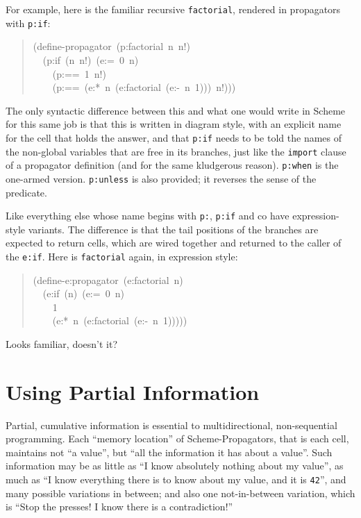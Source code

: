 \documentclass[12pt,letterpaper,english]{article}
\begin{document}
For example, here is the familiar recursive \texttt{factorial}, rendered in
propagators with \texttt{p:if}:
\begin{quote}{\ttfamily \raggedright \noindent
(define-propagator~(p:factorial~n~n!)~\\
~~(p:if~(n~n!)~(e:=~0~n)~\\
~~~~(p:==~1~n!)~\\
~~~~(p:==~(e:*~n~(e:factorial~(e:-~n~1)))~n!)))
}\end{quote}

The only syntactic difference between this and what one would write in
Scheme for this same job is that this is written in diagram style,
with an explicit name for the cell that holds the answer, and that
\texttt{p:if} needs to be told the names of the non-global variables that
are free in its branches, just like the \texttt{import} clause of a
propagator definition (and for the same kludgerous reason).
\texttt{p:when} is the one-armed version.  \texttt{p:unless} is also provided;
it reverses the sense of the predicate.

Like everything else whose name begins with \texttt{p:}, \texttt{p:if} and co
have expression-style variants.  The difference is that the tail
positions of the branches are expected to return cells, which are
wired together and returned to the caller of the \texttt{e:if}.  Here is
\texttt{factorial} again, in expression style:
\begin{quote}{\ttfamily \raggedright \noindent
(define-e:propagator~(e:factorial~n)~\\
~~(e:if~(n)~(e:=~0~n)~\\
~~~~1~\\
~~~~(e:*~n~(e:factorial~(e:-~n~1)))))
}\end{quote}

Looks familiar, doesn't it?



\section{Using Partial Information}
\label{using-partial-information}

Partial, cumulative information is essential to
multidirectional, non-sequential programming.  Each ``memory
location'' of Scheme-Propagators, that is each cell, maintains not ``a
value'', but ``all the information it has about a value''.  Such
information may be as little as ``I know absolutely nothing about my
value'', as much as ``I know everything there is to know about my value,
and it is \texttt{42}'', and many possible variations in between; and also
one not-in-between variation, which is ``Stop the presses!  I know
there is a contradiction!''
\end{document}
